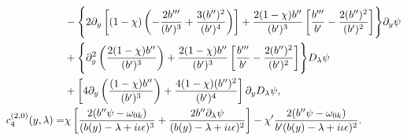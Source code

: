 \documentclass[reqno,11pt]{amsart}
\numberwithin{equation}{section}
\numberwithin{equation}{section} %
\begin{document}
\begin{enumerate}
\begin{align}
      &-\Biggl\{2\partial_y\left[(1-\chi)
       \left(-\frac{2b'''}{(b')^3}+\frac{3(b'')^2}{(b')^4}\right)\right]+\frac{2(1-\chi)b''}{(b')^3}
       \left[\frac{b'''}{b'}-\frac{2(b'')^2}{(b')^2}\right]
       \Biggr\}\partial_y\psi\notag\\
      &+\Biggl\{\partial_y^2\left(\frac{2(1-\chi)b''}{(b')^3}\right)
       +\frac{2(1-\chi)b''}{(b')^3}
       \left[\frac{b'''}{b'}-\frac{2(b'')^2}{(b')^2}\right]
       \Biggr\}D_\lambda\psi\notag\\
      &+\left[4\partial_y\left(\frac{(1-\chi)b''}{(b')^3}\right)
       +\frac{4(1-\chi)(b'')^2}{(b')^4}\right]\partial_yD_\lambda\psi,\notag\\
      c_4^{(2,0)}(y,\lambda)=&\chi\left[\frac{2(b''\psi-\omega_{0k})}{(b(y)-\lambda+i\iota\epsilon)^3}+\frac{2b''\partial_\lambda\psi}{(b(y)-\lambda+i\iota\epsilon)^2}\right]-\chi'\frac{2(b''\psi-\omega_{0k})}{b'(b(y)-\lambda+i\iota\epsilon)^2}.\notag
    \end{align}

\end{enumerate}
\end{document}
